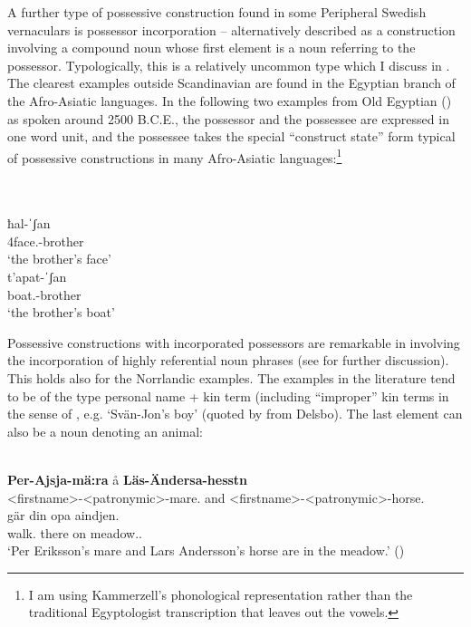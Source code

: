 A further type of possessive construction found in some Peripheral Swedish vernaculars is possessor incorporation – alternatively described as a construction involving a compound noun whose first element is a noun referring to the possessor. Typologically, this is a relatively uncommon type which I discuss in \citet{Dahl2004}. The clearest examples outside Scandinavian are found in the Egyptian branch of the Afro-Asiatic languages. In the following two examples from Old Egyptian (\citet{Kammerzell2000}) as spoken around 2500 B.C.E., the possessor and the possessee are expressed in one word unit, and the possessee takes the special “construct state” form typical of possessive constructions in many Afro-Asiatic languages:\footnote{ I am using Kammerzell’s phonological representation rather than the traditional Egyptologist transcription that leaves out the vowels.}

\ea
{}\\
\ea
{}\\
\gll ħal-ˈʃan\\
4face.{\cs}-brother\\
\glt ‘the brother’s face’  
\ex
{}\\
\gll t’apat-ˈʃan\\
boat.{\cs}-brother\\
\glt ‘the brother’s boat’
\z
\z

Possessive constructions with incorporated possessors are remarkable in involving the incorporation of highly referential noun phrases (see \citet{Dahl2004} for further discussion). This holds also for the Norrlandic examples. The examples in the literature tend to be of the type personal name + kin term (including “improper” kin terms in the sense of \citet{DahlEtAl2001}, e.g.  ‘Svän-Jon’s boy’ (quoted by \citet[38]{Delsing2003a} from Delsbo). The last element can also be a noun denoting an animal:

\ea\label{}
\\
\gll \textbf{Per-Ajsja-mä:ra} å  \textbf{Läs-Ändersa-hesstn}\\
{\textless}firstname{\textgreater}-{\textless}patronymic{\textgreater}-mare.{}  and  {\textless}firstname{\textgreater}-{\textless}patronymic{\textgreater}-horse.{}\\
\gll gär  din  opa  aindjen.\\
walk.{\prs}  there  on  meadow.{}.{\dat}\\
\glt ‘Per Eriksson’s mare and Lars Andersson’s horse are in the meadow.’ (\citet[164]{Källskog1992})
\z

